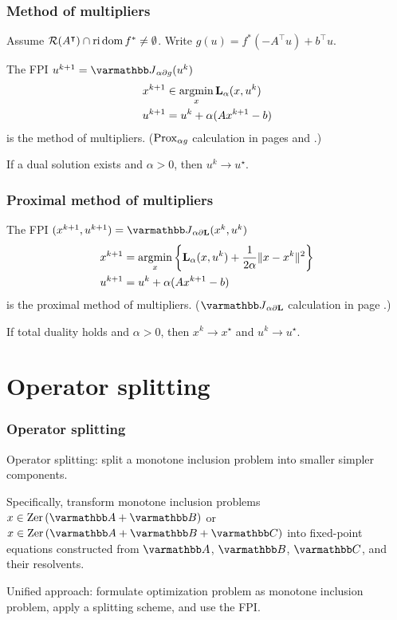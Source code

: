 \documentclass[10pt,mathserif]{beamer}
\begin{document}
\begin{frame}
\frametitle{Method of multipliers}
Assume ${\mathcal{R}}(A^\intercal)\cap \mathrm{ri}\, \mathrm{dom}\, f^*\ne\emptyset$.
Write $g(u)=f^*(-A^\intercal u)+b^\intercal u$.

\vspace{0.2in}

The FPI $u^{k+1}=\opJ_{\alpha \partial g}(u ^k)$
\begin{align*}
x^{k+1} &\in \operatorname*{argmin}_x \mathbf{L}_\alpha (x,u^k)\\
u^{k+1} &= u^k+\alpha (Ax^{k+1}-b)
\end{align*}
is the method of multipliers.
($\mathrm{Prox}_{\alpha g}$  calculation  in pages \pageref{res_subdiff_conj} and \pageref{res_identities}.)

\vspace{0.2in}

If a dual solution exists and $\alpha>0$, then $u^k\rightarrow u^\star$.
\end{frame}

\begin{frame}
\frametitle{Proximal method of multipliers}
The FPI $(x^{k+1},u^{k+1})=\opJ_{\alpha \partial \lagrange}(x^{k},u ^k)$
\begin{align*}
x^{k+1} &= \operatorname*{argmin}_x \left\{\mathbf{L}_{\alpha} (x,u^k)
+\frac{1}{2\alpha}\|x-x^k\|^2\right\}\\
u^{k+1} &= u^k+\alpha (Ax^{k+1}-b)
\end{align*}
is the proximal method of multipliers.
($\opJ_{\alpha \partial \lagrange}$ calculation in page \pageref{kkt_resolvent}.)
\vspace{0.2in}

If total duality holds and $\alpha>0$, then $x^k\rightarrow x^\star$ and $u^k\rightarrow u^\star$.

\end{frame}



\section{Operator splitting}

\begin{frame}
\frametitle{Operator splitting}

Operator splitting:
split a monotone inclusion problem into smaller simpler components.

\vspace{0.2in}

Specifically, transform monotone inclusion problems
 $x\in \zer(\opA+\opB)$
or $x\in \zer(\opA+\opB+\opC)$
into fixed-point equations constructed from $\opA$, $\opB$, $\opC$, and their resolvents.


\vspace{0.2in}
Unified approach: formulate optimization problem as monotone inclusion problem, apply a splitting scheme, and use the FPI.
\end{frame}
\end{document}
